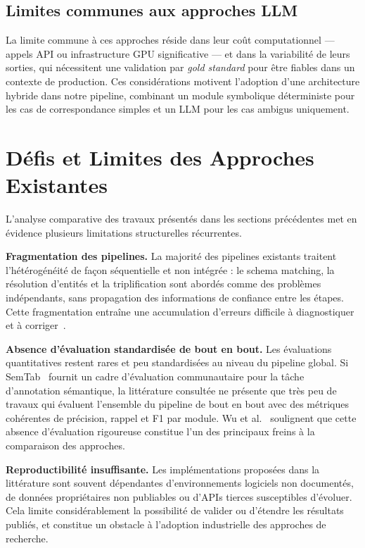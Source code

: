 \subsection{Limites communes aux approches LLM}
La limite commune à ces approches réside dans leur coût computationnel — appels API ou infrastructure GPU significative — et dans la variabilité de leurs sorties, qui nécessitent une validation par \textit{gold standard} pour être fiables dans un contexte de production. Ces considérations motivent l'adoption d'une architecture hybride dans notre pipeline, combinant un module symbolique déterministe pour les cas de correspondance simples et un LLM pour les cas ambigus uniquement.

\section{Défis et Limites des Approches Existantes}\label{sec:defis}
L'analyse comparative des travaux présentés dans les sections précédentes met en évidence plusieurs limitations structurelles récurrentes.

\textbf{Fragmentation des pipelines.} La majorité des pipelines existants traitent l'hétérogénéité de façon séquentielle et non intégrée : le schema matching, la résolution d'entités et la triplification sont abordés comme des problèmes indépendants, sans propagation des informations de confiance entre les étapes. Cette fragmentation entraîne une accumulation d'erreurs difficile à diagnostiquer et à corriger~\cite{wu2023comprehensive}.

\textbf{Absence d'évaluation standardisée de bout en bout.} Les évaluations quantitatives restent rares et peu standardisées au niveau du pipeline global. Si SemTab~\cite{semtab2024, semtab2023} fournit un cadre d'évaluation communautaire pour la tâche d'annotation sémantique, la littérature consultée ne présente que très peu de travaux qui évaluent l'ensemble du pipeline de bout en bout avec des métriques cohérentes de précision, rappel et F1 par module. Wu et al.~\cite{wu2023comprehensive} soulignent que cette absence d'évaluation rigoureuse constitue l'un des principaux freins à la comparaison des approches.

\textbf{Reproductibilité insuffisante.} Les implémentations proposées dans la littérature sont souvent dépendantes d'environnements logiciels non documentés, de données propriétaires non publiables ou d'APIs tierces susceptibles d'évoluer. Cela limite considérablement la possibilité de valider ou d'étendre les résultats publiés, et constitue un obstacle à l'adoption industrielle des approches de recherche.

